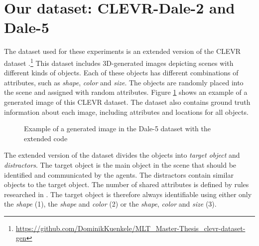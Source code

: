 \documentclass[11pt]{article}
\begin{document}
\section{Our dataset: CLEVR-Dale-2 and Dale-5}


The dataset used for these experiments is an extended version of the CLEVR dataset \citep{Johnson2016}.\footnote{\href{https://github.com/DominikKuenkele/MLT\_Master-Thesis\_clevr-dataset-gen}{https://github.com/DominikKuenkele/MLT\_Master-Thesis\_clevr-dataset-gen}}
This dataset includes 3D-generated images depicting scenes with different kinds of objects.
Each of these objects has different combinations of attributes, such as \emph{shape}, \emph{color} and \emph{size}.
The objects are randomly placed into the scene and assigned with random attributes.
Figure \ref{fig:clevr-extended_example} shows an example of a generated image of this CLEVR dataset.
The dataset also contains ground truth information about each image, including attributes and locations for all objects.

\begin{figure}[h]
  \centering
  \caption{Example of a generated image in the Dale-5 dataset with the extended code}
  \label{fig:clevr-extended_example}
\end{figure}

The extended version of the dataset divides the objects into \emph{target object} and \emph{distractors}.
The target object is the main object in the scene that should be identified and communicated by the agents.
The distractors contain similar objects to the target object.
The number of shared attributes is defined by rules researched in \citet{Dale1995}.
The target object is therefore always identifiable using either only the \emph{shape} (1), the \emph{shape} and \emph{color} (2) or the \emph{shape}, \emph{color} and \emph{size} (3).
\end{document}
